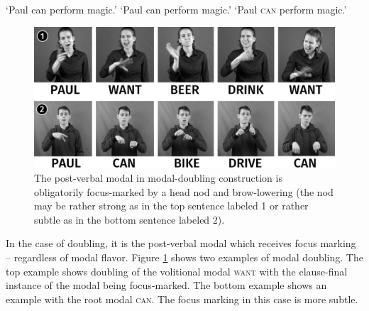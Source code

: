 \begin{exe}
\ex\begin{xlist} 

\glt `Paul can perform magic.' \label{ex:doublinga}
\glt `Paul can perform magic.' \label{ex:doublingb}
\ex {} 
\glt `Paul \textsc{can} perform magic.' \label{ex:doublingc} 

\end{xlist}
\end{exe} 

\begin{figure}[bt]
\centering
	\includegraphics[width=1.0\textwidth]{modaldoublingsw.jpg}
	\caption{The post-verbal modal in modal-doubling construction is obligatorily focus-marked by a head nod and brow-lowering (the nod may be rather strong as in the top sentence labeled 1 or rather subtle as in the bottom sentence labeled 2).}
	\label{fig:modaldoubling}
\end{figure}

\noindent In the case of doubling, it is the post-verbal modal which receives focus marking -- regardless of modal flavor. Figure \ref{fig:modaldoubling} shows two examples of modal doubling. The top example shows doubling of the volitional modal \textsc{want} with the clause-final instance of the modal being focus-marked. The bottom example shows an example with the root modal \textsc{can}. The focus marking in this case is more subtle.






